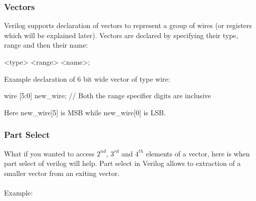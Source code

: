 \documentclass[a4paper,10pt]{article}
\theoremstyle{mytheor}
\newcommand{
  \insertverilog}[3]{
  
}
\begin{document}
\insertverilog{./verilog_files/andGate4.v}{andGate4-wire}{\text{Use of wires to connect output of one module to input of another}}

\subsubsection*{Vectors}
Verilog supports declaration of vectors to represent a group of wires (or registers which will be explained later). Vectors are declared by specifying their type, range and then their name:
\begin{center}
  <type> <range> <name>;
\end{center}

Example declaration of 6 bit wide vector of type wire:
\begin{center}
  {\color{blue} wire} [{\color{orange}5}:{\color{orange}0}] new\_wire; {\color{vgreen}// Both the range specifier digits are inclusive}
\end{center}

Here new\_wire[{\color{orange}5}] is MSB while new\_wire[{\color{orange}0}] is LSB.

\subsubsection*{Part Select}
What if you wanted to access $2^{nd}$, $3^{rd}$ and $4^{th}$ elements of a vector, here is when part select of verilog will help. Part select in Verilog allows to extraction of a smaller vector from an exiting vector.\\ 
\vspace{0.2cm}\\
Example:
\insertverilog{./verilog_files/bitExtract.v}{bit-extract}{\text{Using bit extract to extract lower, higher and middle 16 bits from a 32 bit input}}
\end{document}
